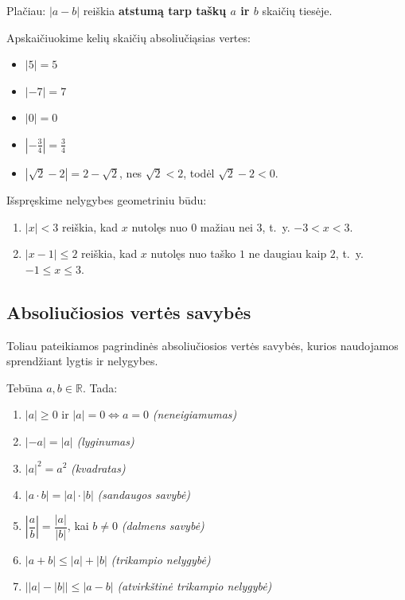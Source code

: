 Plačiau: $|a - b|$ reiškia \textbf{atstumą tarp taškų $a$ ir $b$} skaičių tiesėje.

\begin{example}
Apskaičiuokime kelių skaičių absoliučiąsias vertes:
\begin{itemize}
    \item $|5| = 5$
    \item $|-7| = 7$
    \item $|0| = 0$
    \item $|-\tfrac{3}{4}| = \tfrac{3}{4}$
    \item $|\sqrt{2} - 2| = 2 - \sqrt{2}$, nes $\sqrt{2} < 2$, todėl $\sqrt{2}-2 < 0$.
\end{itemize}
\end{example}

\begin{example}
Išspręskime nelygybes geometriniu būdu:
\begin{enumerate}[label=\alph*)]
    \item $|x| < 3$ reiškia, kad $x$ nutolęs nuo $0$ mažiau nei $3$, t.~y. $-3 < x < 3$.
    \item $|x - 1| \leq 2$ reiškia, kad $x$ nutolęs nuo taško $1$ ne daugiau kaip $2$, t.~y. $-1 \leq x \leq 3$.
\end{enumerate}
\end{example}

\subsection{Absoliučiosios vertės savybės}

Toliau pateikiamos pagrindinės absoliučiosios vertės savybės, kurios naudojamos sprendžiant lygtis ir nelygybes.

\begin{theorem}
\label{thm:abs_savybes}
Tebūna $a, b \in \mathbb{R}$. Tada:
\begin{enumerate}[label=\arabic*.]
    \item $|a| \geq 0$ ir $|a| = 0 \iff a = 0$ \hfill \emph{(neneigiamumas)}
    \item $|-a| = |a|$ \hfill \emph{(lyginumas)}
    \item $|a|^2 = a^2$ \hfill \emph{(kvadratas)}
    \item $|a \cdot b| = |a| \cdot |b|$ \hfill \emph{(sandaugos savybė)}
    \item $\left|\dfrac{a}{b}\right| = \dfrac{|a|}{|b|}$, kai $b \neq 0$ \hfill \emph{(dalmens savybė)}
    \item $|a + b| \leq |a| + |b|$ \hfill \emph{(trikampio nelygybė)}
    \item $\bigl||a| - |b|\bigr| \leq |a - b|$ \hfill \emph{(atvirkštinė trikampio nelygybė)}
\end{enumerate}
\end{theorem}

